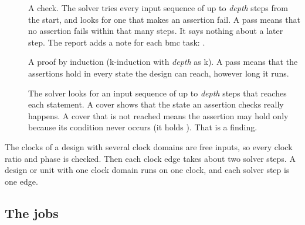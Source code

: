 \begin{description}
\item[] A  check. The solver tries every input sequence of up to
  \emph{depth} steps from the start, and looks for one that makes an assertion fail. A
  pass means that no assertion fails within that many steps. It says nothing about a
  later step. The report adds a note for each bmc task:
  .
\item[] A proof by induction (k-induction with \emph{depth} as k). A pass
  means that the assertions hold in every state the design can reach, however long it
  runs.
\item[] The solver looks for an input sequence of up to \emph{depth} steps
  that reaches each  statement. A cover shows that the state an assertion
  checks really happens. A cover that is not reached means the assertion may hold only
  because its condition never occurs (it holds ). That is a finding.
\end{description}

The clocks of a design with several clock domains are free inputs, so every clock ratio
and phase is checked. Then each clock edge takes about two solver steps. A design or
unit with one clock domain runs on one clock, and each solver step is one edge.

\subsection{The jobs}


